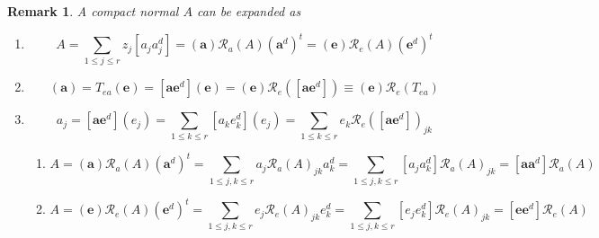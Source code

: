 \documentclass[aps,preprint]{revtex4}%
\newtheorem{remark}[theorem]{Remark}
\begin{document}
\begin{remark}
A compact normal $A$ can be expanded as

\begin{enumerate}
\item
\begin{equation}
A=\sum_{1\leq j\leq r}z_{j}\left[  a_{j}a_{j}^{d}\right]  =\left(
\mathbf{a}\right)  \mathcal{R}_{a}\left(  A\right)  \left(  \mathbf{a}%
^{d}\right)  ^{t}=\left(  \mathbf{e}\right)  \mathcal{R}_{e}\left(  A\right)
\left(  \mathbf{e}^{d}\right)  ^{t}%
\end{equation}


\item
\begin{equation}
\left(  \mathbf{a}\right)  =T_{ea}\left(  \mathbf{e}\right)  =\left[
\mathbf{ae}^{d}\right]  \left(  \mathbf{e}\right)  =\left(  \mathbf{e}\right)
\mathcal{R}_{e}\left(  \left[  \mathbf{ae}^{d}\right]  \right)  \equiv\left(
\mathbf{e}\right)  \mathcal{R}_{e}\left(  T_{ea}\right)
\end{equation}


\item
\begin{equation}
a_{j}=\left[  \mathbf{ae}^{d}\right]  \left(  e_{j}\right)  =\sum_{1\leq k\leq
r}\left[  a_{k}e_{k}^{d}\right]  \left(  e_{j}\right)  =\sum_{1\leq k\leq
r}e_{k}\mathcal{R}_{e}\left(  \left[  \mathbf{ae}^{d}\right]  \right)  _{jk}%
\end{equation}


\begin{enumerate}
\item
\begin{equation}
A=\left(  \mathbf{a}\right)  \mathcal{R}_{a}\left(  A\right)  \left(
\mathbf{a}^{d}\right)  ^{t}=\sum_{1\leq j,k\leq r}a_{j}\mathcal{R}_{a}\left(
A\right)  _{jk}a_{k}^{d}=\sum_{1\leq j,k\leq r}\left[  a_{j}a_{k}^{d}\right]
\mathcal{R}_{a}\left(  A\right)  _{jk}=\left[  \mathbf{aa}^{d}\right]
\mathcal{R}_{a}\left(  A\right)
\end{equation}


\item
\begin{equation}
A=\left(  \mathbf{e}\right)  \mathcal{R}_{e}\left(  A\right)  \left(
\mathbf{e}^{d}\right)  ^{t}=\sum_{1\leq j,k\leq r}e_{j}\mathcal{R}_{e}\left(
A\right)  _{jk}e_{k}^{d}=\sum_{1\leq j,k\leq r}\left[  e_{j}e_{k}^{d}\right]
\mathcal{R}_{e}\left(  A\right)  _{jk}=\left[  \mathbf{ee}^{d}\right]
\mathcal{R}_{e}\left(  A\right)
\end{equation}



\end{enumerate}
\end{enumerate}
\end{remark}
\end{document}
